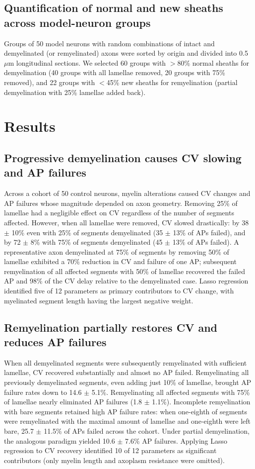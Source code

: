\documentclass[11pt]{article}
\begin{document}
\subsection{Quantification of normal and new sheaths across model-neuron groups}
Groups of 50 model neurons with random combinations of intact and demyelinated (or remyelinated) axons were sorted by origin and divided into 0.5 $\mu$m longitudinal sections. We selected 60 groups with $>$80\% normal sheaths for demyelination (40 groups with all lamellae removed, 20 groups with 75\% removed), and 22 groups with $<$45\% new sheaths for remyelination (partial demyelination with 25\% lamellae added back).

\section{Results}
\subsection{Progressive demyelination causes CV slowing and AP failures}
Across a cohort of 50 control neurons, myelin alterations caused CV changes and AP failures whose magnitude depended on axon geometry. Removing 25\% of lamellae had a negligible effect on CV regardless of the number of segments affected. However, when all lamellae were removed, CV slowed drastically: by 38 $\pm$ 10\% even with 25\% of segments demyelinated (35 $\pm$ 13\% of APs failed), and by 72 $\pm$ 8\% with 75\% of segments demyelinated (45 $\pm$ 13\% of APs failed). A representative axon demyelinated at 75\% of segments by removing 50\% of lamellae exhibited a 70\% reduction in CV and failure of one AP; subsequent remyelination of all affected segments with 50\% of lamellae recovered the failed AP and 98\% of the CV delay relative to the demyelinated case. Lasso regression identified five of 12 parameters as primary contributors to CV change, with myelinated segment length having the largest negative weight.

\subsection{Remyelination partially restores CV and reduces AP failures}
When all demyelinated segments were subsequently remyelinated with sufficient lamellae, CV recovered substantially and almost no AP failed. Remyelinating all previously demyelinated segments, even adding just 10\% of lamellae, brought AP failure rates down to 14.6 $\pm$ 5.1\%. Remyelinating all affected segments with 75\% of lamellae nearly eliminated AP failures (1.8 $\pm$ 1.1\%). Incomplete remyelination with bare segments retained high AP failure rates: when one-eighth of segments were remyelinated with the maximal amount of lamellae and one-eighth were left bare, 25.7 $\pm$ 11.5\% of APs failed across the cohort. Under partial demyelination, the analogous paradigm yielded 10.6 $\pm$ 7.6\% AP failures. Applying Lasso regression to CV recovery identified 10 of 12 parameters as significant contributors (only myelin length and axoplasm resistance were omitted).
\end{document}
